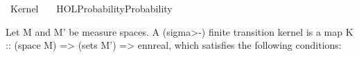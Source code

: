 %
\begin{isabellebody}%
%
%
\isadelimtheory
%
\endisadelimtheory
%
\isatagtheory
{}\isamarkupfalse%
\ Kernel\isanewline
\ \ \ {\isachardoublequoteopen}HOL{\isacharminus}{\kern0pt}Probability{\isachardot}{\kern0pt}Probability{\isachardoublequoteclose}\isanewline
{}%
\endisatagtheory
{\isafoldtheory}%
%
\isadelimtheory
%
\endisadelimtheory
%
\isadelimdocument
%
\endisadelimdocument
%
\isatagdocument
%
\isamarkuptrue%
%
\endisatagdocument
{\isafolddocument}%
%
\isadelimdocument
%
\endisadelimdocument
%
\begin{isamarkuptext}%
Let M and M' be measure spaces. A (\<sigma>-) finite transition kernel is a map
   K :: (space M) => (sets M') => ennreal, which satisfies the following conditions:


\end{isamarkuptext}
\end{isabellebody}
